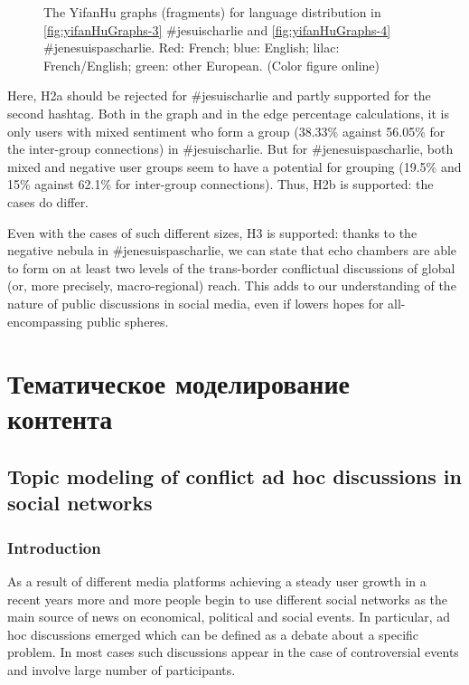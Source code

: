 \begin{figure}[ht]
	\caption{The YifanHu graphs (fragments) for language distribution in \cref{fig:yifanHuGraphs-3} \#jesuischarlie and \cref{fig:yifanHuGraphs-4} \#jenesuispascharlie. Red: French; blue: English; lilac: French/English; green: other European. (Color figure online)}\label{fig:yifanHuGraphs-34}
\end{figure}

Here, H2a should be rejected for \#jesuischarlie and partly supported for the second hashtag. Both in the graph and in the edge percentage calculations, it is only users with mixed sentiment who form a group (38.33\% against 56.05\% for the inter-group connections) in \#jesuischarlie. But for \#jenesuispascharlie, both mixed and negative user groups seem to have a potential for grouping (19.5\% and 15\% against 62.1\% for inter-group connections). Thus, H2b is supported: the cases do differ.

Even with the cases of such different sizes, H3 is supported: thanks to the negative nebula in \#jenesuispascharlie, we can state that echo chambers are able to form on at least two levels of the trans-border conflictual discussions of global (or, more precisely, macro-regional) reach. This adds to our understanding of the nature of public discussions in social media, even if lowers hopes for all-encompassing public spheres.

\section{Тематическое моделирование контента}\label{sec:ch5/sect2}

\subsection{Topic modeling of conflict ad hoc discussions in social networks}\label{subsec:ch5/sec2/sub1}

\subsubsection{Introduction}

As a result of different media platforms achieving a steady user growth in a recent years more and more people begin to use different social networks as the main source of news on economical, political and social events. In particular, ad hoc discussions emerged which can be defined as a debate about a specific problem. In most cases such discussions appear in the case of controversial events and involve large number of participants.

